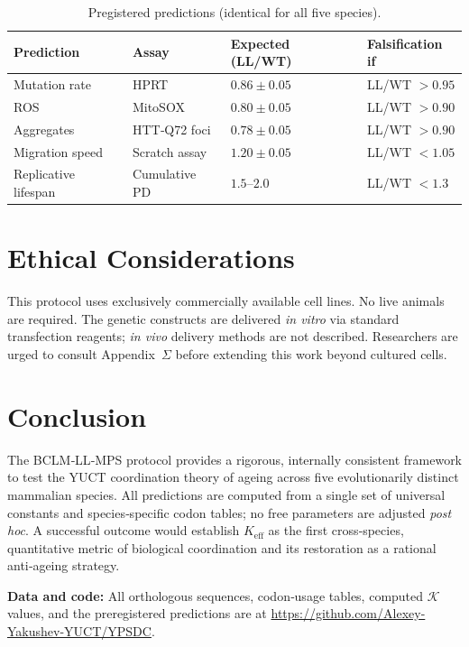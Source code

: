 \documentclass[12pt,a4paper]{article}
\newcommand{\REL}{\mathcal{K}}          %
\begin{document}
	\begin{table}[H]
		\centering
		\caption{Pregistered predictions (identical for all five species).}
		\label{tab:predictions}
		\begin{tabular}{@{}llll@{}}
			\toprule
			\textbf{Prediction} & \textbf{Assay} & \textbf{Expected (LL/WT)} & \textbf{Falsification if} \\
			\midrule
			Mutation rate       & HPRT           & \(0.86 \pm 0.05\) & LL/WT \(> 0.95\) \\
			ROS                 & MitoSOX        & \(0.80 \pm 0.05\) & LL/WT \(> 0.90\) \\
			Aggregates          & HTT‑Q72 foci   & \(0.78 \pm 0.05\) & LL/WT \(> 0.90\) \\
			Migration speed     & Scratch assay  & \(1.20 \pm 0.05\) & LL/WT \(< 1.05\) \\
			Replicative lifespan & Cumulative PD  & \(1.5\)–\(2.0\)   & LL/WT \(< 1.3\) \\
			\bottomrule
		\end{tabular}
	\end{table}
	
	\section{Ethical Considerations}
	\label{sec:ethics}
	This protocol uses exclusively commercially available cell lines. No live animals are required. The genetic constructs are delivered \textit{in vitro} via standard transfection reagents; \textit{in vivo} delivery methods are not described. Researchers are urged to consult Appendix~\(\Sigma\) before extending this work beyond cultured cells.
	
	\section{Conclusion}
	\label{sec:conclusion}
	The BCLM‑LL‑MPS protocol provides a rigorous, internally consistent framework to test the YUCT coordination theory of ageing across five evolutionarily distinct mammalian species. All predictions are computed from a single set of universal constants and species‑specific codon tables; no free parameters are adjusted \textit{post hoc}. A successful outcome would establish \(K_{\mathrm{eff}}\) as the first cross‑species, quantitative metric of biological coordination and its restoration as a rational anti‑ageing strategy.
	
	\vspace{0.5cm}
	\noindent\textbf{Data and code:} All orthologous sequences, codon‑usage tables, computed \(\REL\) values, and the preregistered predictions are at \url{https://github.com/Alexey-Yakushev-YUCT/YPSDC}.
	
\end{document}
